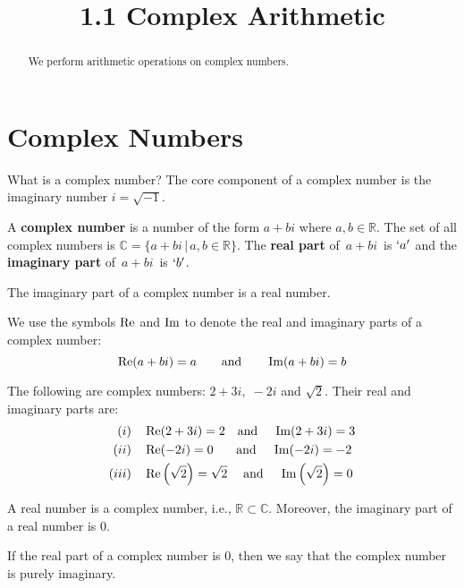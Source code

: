 \documentclass[handout]{ximera}
\title{1.1 Complex Arithmetic}
\begin{document}
\begin{abstract}
We perform arithmetic operations on complex numbers.
\end{abstract}

\maketitle

\section{Complex Numbers}

What is a complex number?  The core component of a complex number is the imaginary number $i = \sqrt{-1}$.

\begin{definition}
A {\bf complex number} is a number of the form $a+bi$ where $a,b \in \mathbb{R}$. 
The set of all complex numbers is $\mathbb{C}= \{a+bi \,|\, a,b \in \mathbb{R}\}$. 
The {\bf real part} of $\,a+bi\,$ is $`a'$ and the {\bf imaginary part} of $\,a+bi\,$ is $`b'$.
\end{definition}

\begin{remark}
The imaginary part of a complex number is a real number.
\end{remark}

We use the symbols $\operatorname{Re}$ and $\operatorname{Im}$ to denote the real and imaginary parts of a complex number:
\[
\operatorname{Re}(a+bi) = a \qquad \mbox{and} \qquad \operatorname{Im}(a+bi) = b
\]


\begin{example}[Example 1] 
The following are complex numbers: $2+3i, \; -2i$ and $\sqrt 2$.
Their real and imaginary parts are:
\begin{align*}
(i)& \quad \operatorname{Re}(2+3i) = 2 \quad \mbox{and} \quad \;\operatorname{Im}(2+3i) = 3 \\
(ii)& \quad \operatorname{Re}(-2i) = 0 \quad \;\;\; \mbox{and} \quad \;\operatorname{Im}(-2i) = -2 \\
(iii)& \quad \operatorname{Re}\left(\sqrt 2\right) = \sqrt 2 \quad \;\mbox{and} \quad \;\operatorname{Im}\left(\sqrt 2\right) = 0 
\end{align*}

\end{example}


\begin{remark}
A real number is a complex number, i.e., $\mathbb{R} \subset \mathbb{C}$. 
Moreover, the imaginary part of a real number is $0$.
\end{remark}
\begin{remark}
If the real part of a complex number is $0$, then we say that the complex number is purely imaginary. 
\end{remark}
\end{document}
